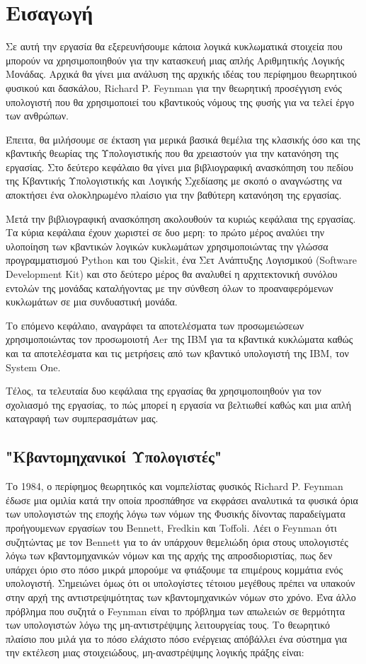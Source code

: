 \chapter{Εισαγωγή}

Σε αυτή την εργασία θα εξερευνήσουμε κάποια λογικά κυκλωματικά στοιχεία που μπορούν να χρησιμοποιηθούν για την κατασκευή μιας απλής Αριθμητικής
Λογικής Μονάδας. Αρχικά θα γίνει μια ανάλυση της αρχικής ιδέας του περίφημου θεωρητικού φυσικού και δασκάλου, Richard P. Feynman
για την θεωρητική προσέγγιση ενός υπολογιστή που θα χρησιμοποιεί του κβαντικούς νόμους της φυσής για να τελεί έργο των ανθρώπων.

Έπειτα, θα μιλήσουμε σε έκταση για μερικά βασικά θεμέλια της κλασικής όσο και της κβαντικής θεωρίας της Υπολογιστικής που θα χρειαστούν για την
κατανόηση της εργασίας. Στο δεύτερο κεφάλαιο θα γίνει μια βιβλιογραφική ανασκόπηση του πεδίου της Κβαντικής Υπολογιστικής και Λογικής Σχεδίασης
με σκοπό ο αναγνώστης να αποκτήσει ένα ολοκληρωμένο πλαίσιο για την βαθύτερη κατανόηση της εργασίας.

Μετά την βιβλιογραφική ανασκόπηση ακολουθούν τα κυριώς κεφάλαια της εργασίας. Τα κύρια κεφάλαια έχουν χωριστεί σε δυο μερη: το πρώτο μέρος αναλύει
την υλοποίηση των κβαντικών λογικών κυκλωμάτων χρησιμοποιώντας την γλώσσα προγραμματισμού Python και του Qiskit, ένα Σετ Ανάπτυξης Λογισμικού
(Software Development Kit) και στο δεύτερο μέρος θα αναλυθεί η αρχιτεκτονική συνόλου εντολών της μονάδας καταλήγοντας με την σύνθεση όλων το προαναφερόμενων κυκλωμάτων σε μια συνδυαστική μονάδα.

Το επόμενο κεφάλαιο, αναγράφει τα αποτελέσματα των προσωμειώσεων χρησιμοποιώντας τον προσωμοιοτή Aer της IBM για τα κβαντικά κυκλώματα καθώς
και τα αποτελέσματα και τις μετρήσεις από των κβαντικό υπολογιστή της IBM, τον System One.

Τέλος, τα τελευταία δυο κεφάλαια της εργασίας θα χρησιμοποιηθούν για τον σχολιασμό της εργασίας, το πώς μπορεί η εργασία να βελτιωθεί καθώς
και μια απλή καταγραφή των συμπερασμάτων μας.

\section{"Κβαντομηχανικοί Υπολογιστές"}
Το 1984, ο περίφημος θεωρητικός και νομπελίστας φυσικός Richard P. Feynman έδωσε μια ομιλία κατά την οποία προσπάθησε να
εκφράσει αναλυτικά τα φυσικά όρια των υπολογιστών της εποχής λόγω των νόμων της Φυσικής δίνοντας παραδείγματα προήγουμενων εργασίων του Bennett,
Fredkin και Toffoli.
Λέει ο Feynman \cite{Feynman1986} ότι συζητώντας με τον Bennett για το άν υπάρχουν θεμελιώδη όρια στους υπολογιστές λόγω των κβαντομηχανικών νόμων
και της αρχής της απροσδιοριστίας, πως δεν υπάρχει όριο στο πόσο μικρά μπορούμε να φτιάξουμε τα επιμέρους κομμάτια ενός υπολογιστή. Σημειώνει όμως
ότι οι υπολογίστες τέτοιου μεγέθους πρέπει να υπακούν στην αρχή της αντιστρεψιμότητας των κβαντομηχανικών νόμων στο χρόνο.
Ένα άλλο πρόβλημα που συζητά ο Feynman είναι το πρόβλημα των απωλειών σε θερμότητα των υπολογιστών λόγω της μη-αντιστρέψιμης λειτουργείας τους.
Το θεωρητικό πλαίσιο που μιλά για το πόσο ελάχιστο πόσο ενέργειας απόβάλλει ένα σύστημα για την εκτέλεση μιας στοιχειώδους, μη-αναστρέψιμης λογικής πράξης είναι:

